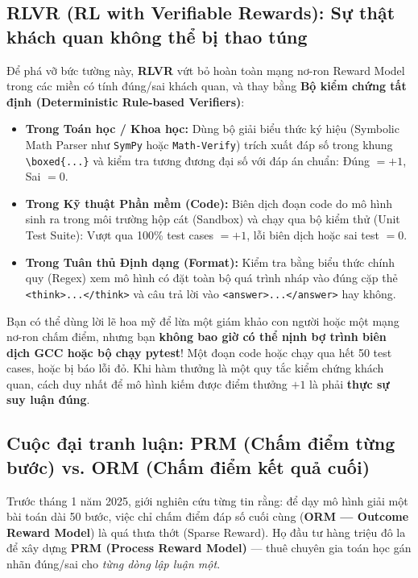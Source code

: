 \subsection{RLVR (RL with Verifiable Rewards): Sự thật khách quan không thể bị thao túng}

Để phá vỡ bức tường này, \textbf{RLVR} \citep{lambert2024tulu, deepseek2025r1} vứt bỏ hoàn toàn mạng nơ-ron Reward Model trong các miền có tính đúng/sai khách quan, và thay bằng \textbf{Bộ kiểm chứng tất định (Deterministic Rule-based Verifiers)}:
\begin{itemize}
  \item \textbf{Trong Toán học / Khoa học:} Dùng bộ giải biểu thức ký hiệu (Symbolic Math Parser như \texttt{SymPy} hoặc \texttt{Math-Verify}) trích xuất đáp số trong khung \texttt{\textbackslash boxed\{...\}} và kiểm tra tương đương đại số với đáp án chuẩn: Đúng $= +1$, Sai $= 0$.
  \item \textbf{Trong Kỹ thuật Phần mềm (Code):} Biên dịch đoạn code do mô hình sinh ra trong môi trường hộp cát (Sandbox) và chạy qua bộ kiểm thử (Unit Test Suite): Vượt qua 100\% test cases $= +1$, lỗi biên dịch hoặc sai test $= 0$.
  \item \textbf{Trong Tuân thủ Định dạng (Format):} Kiểm tra bằng biểu thức chính quy (Regex) xem mô hình có đặt toàn bộ quá trình nháp vào đúng cặp thẻ \texttt{<think>...</think>} và câu trả lời vào \texttt{<answer>...</answer>} hay không.
\end{itemize}

\begin{mentalmodel}
Bạn có thể dùng lời lẽ hoa mỹ để lừa một giám khảo con người hoặc một mạng nơ-ron chấm điểm, nhưng bạn \textbf{không bao giờ có thể nịnh bợ trình biên dịch GCC hoặc bộ chạy pytest}! Một đoạn code hoặc chạy qua hết 50 test cases, hoặc bị báo lỗi đỏ. Khi hàm thưởng là một quy tắc kiểm chứng khách quan, cách duy nhất để mô hình kiếm được điểm thưởng $+1$ là phải \textbf{thực sự suy luận đúng}.
\end{mentalmodel}

\subsection{Cuộc đại tranh luận: PRM (Chấm điểm từng bước) vs. ORM (Chấm điểm kết quả cuối)}

Trước tháng 1 năm 2025, giới nghiên cứu từng tin rằng: để dạy mô hình giải một bài toán dài 50 bước, việc chỉ chấm điểm đáp số cuối cùng (\textbf{ORM --- Outcome Reward Model}) là quá thưa thớt (Sparse Reward). Họ đầu tư hàng triệu đô la để xây dựng \textbf{PRM (Process Reward Model)} \citep{uesato2022solving, lightman2023lets} --- thuê chuyên gia toán học gán nhãn đúng/sai cho \textit{từng dòng lập luận một}.

